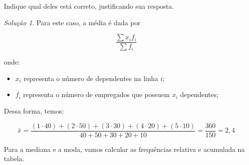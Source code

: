 \documentclass[
]{latex/krantz}
\providecommand{\tightlist}{%
  \setlength{\itemsep}{0pt}\setlength{\parskip}{0pt}}
\theoremstyle{definition}
\theoremstyle{definition}
\theoremstyle{definition}
\theoremstyle{definition}
\theoremstyle{remark}
\newtheorem*{solution}{Solução}
\begin{document}
Indique qual deles está correto, justificando sua resposta.

\begin{solution}
Para este caso, a média é dada por

\[\frac{\sum{x_if_i}}{\sum{f_i}}\]

onde:

\begin{itemize}
\tightlist
\item
  \(x_i\) representa o número de dependentes na linha \(i\);
\item
  \(f_i\) representa o número de empregados que possuem \(x_i\) dependentes;
\end{itemize}

Dessa forma, temos:

\[
\bar{x} = \frac{(1 \cdot 40) + (2 \cdot 50) + (3 \cdot 30) + (4 \cdot 20) + (5 \cdot 10)}{40 + 50 + 30 + 20 + 10} = \frac{360}{150} = 2,4
\]

Para a mediana e a moda, vamos calcular as frequências relativa e acumulada na tabela.


\end{solution}
\end{document}
